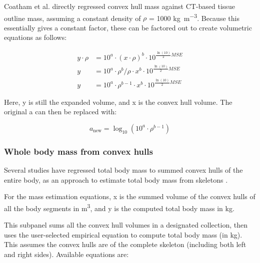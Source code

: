 \documentclass{article}
\begin{document}
Coatham et al. directly regressed convex hull mass against CT-based tissue outline mass, assuming a constant density of \(\rho\) = 1000 \si{kg m^{-3}}. Because this essentially gives a constant factor, these can be factored out to create volumetric equations as follows:

\begin{equation}
\begin{aligned}
y \cdot \rho &= 10^a \cdot (x \cdot \rho )^{b} \cdot 10^{\frac{\ln(10)}{2} MSE } \\
y &= 10^a \cdot \rho^{b} / \rho  \cdot x^{b} \cdot 10^{\frac{\ln(10)}{2} MSE } \\
y &= 10^a \cdot \rho^{b - 1} \cdot x^{b} \cdot 10^{\frac{\ln(10)}{2} MSE }
\end{aligned}
\end{equation}


Here, y is still the expanded volume, and x is the convex hull volume. The original a can then be replaced with: 


\begin{equation}
a_{\text{new}} = \log_{10} \left( 10^a \cdot \rho^{b - 1} \right)
\end{equation}




\subsubsection{Whole body mass from convex hulls}

Several studies have regressed total body mass to summed convex hulls of the entire body, as an approach to estimate total body mass from skeletons \cite{brasseyScalingConvexHull2014,brasseyConvexhullMassEstimates2016,brasseyVolumetricTechniqueFossil2018,wrightVolumetricElementscalingMass2024}. 

For the mass estimation equations, x is the summed volume of the convex hulls of all the body segments in \si{m^3}, and y is the computed total body mass in \si{kg}.

This subpanel sums all the convex hull volumes in a designated collection, then uses the user-selected empirical equation to compute total body mass (in kg). This assumes the convex hulls are of the complete skeleton (including both left and right sides). Available equations are:
\end{document}
